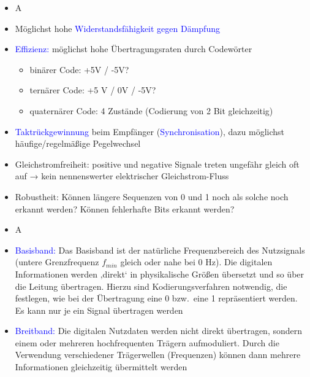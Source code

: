 
\begin{itemize}
    \item \todo A
\end{itemize}

\begin{itemize}
    \item Möglichst hohe \textcolor{blue}{Widerstandsfähigkeit gegen Dämpfung}\
    \item \textcolor{blue}{Effizienz:} möglichst hohe Übertragungsraten durch Codewörter
    \begin{itemize}
        \item binärer Code: +5V / -5V?
        \item ternärer Code: +5 V / 0V / -5V?
        \item quaternärer Code: 4 Zustände (Codierung von 2 Bit gleichzeitig)
    \end{itemize}
    \item \textcolor{blue}{Taktrückgewinnung} beim Empfänger (\textcolor{blue}{Synchronisation}), dazu möglichst
    häufige/regelmäßige Pegelwechsel
    \item Gleichstromfreiheit: positive und negative Signale treten ungefähr gleich oft
    auf → kein nennenswerter elektrischer Gleichstrom-Fluss
    \item Robustheit: Können längere Sequenzen von 0 und 1 noch als solche noch
    erkannt werden?
    Können fehlerhafte Bits erkannt werden?
\end{itemize}

\begin{itemize}
    \item \todo A
\end{itemize}

\begin{itemize}
    \item \textcolor{blue}{Basisband:} Das Basisband ist der natürliche Frequenzbereich des Nutzsignals (untere Grenzfrequenz $f_{min}$ gleich oder nahe bei 0 Hz).
    Die digitalen Informationen werden ‚direkt‘ in physikalische Größen übersetzt und so über die Leitung übertragen.
    Hierzu sind Kodierungsverfahren notwendig, die festlegen, wie bei der Übertragung eine 0 bzw.\ eine 1 repräsentiert werden.
    Es kann nur je ein Signal übertragen werden
    \item \textcolor{blue}{Breitband:} Die digitalen Nutzdaten werden nicht direkt übertragen, sondern einem oder mehreren hochfrequenten Trägern aufmoduliert.
    Durch die Verwendung verschiedener Trägerwellen (Frequenzen) können dann mehrere Informationen gleichzeitig übermittelt werden
\end{itemize}

